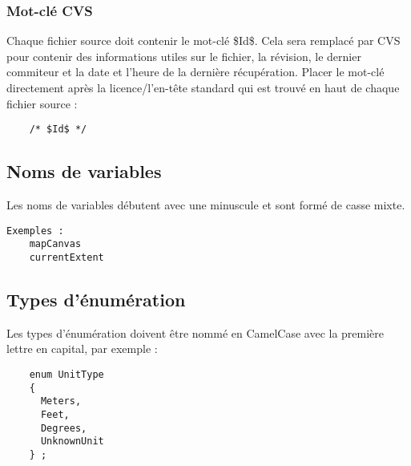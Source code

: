 \subsubsection{Mot-cl\'e CVS}
Chaque fichier source doit contenir le mot-cl\'e \$Id\$. Cela sera remplac\'e par CVS pour contenir des informations utiles sur le fichier, la r\'evision, le dernier commiteur et la date et l'heure de la derni\`ere r\'ecup\'eration. 
Placer le mot-cl\'e directement apr\`es la licence/l'en-t\^ete standard qui est trouv\'e en haut de chaque fichier source :
\begin{verbatim}
	/* $Id$ */
\end{verbatim}

\subsection{Noms de variables}
Les noms de variables d\'ebutent avec une minuscule et sont form\'e de casse mixte.
\begin{verbatim}
Exemples :
	mapCanvas
	currentExtent
\end{verbatim}
\subsection{Types d'\'enum\'eration}
Les types d'\'enum\'eration doivent \^etre nomm\'e en CamelCase avec la premi\`ere lettre en capital, par exemple :
\begin{verbatim}
    enum UnitType
    {
      Meters,
      Feet,
      Degrees,
      UnknownUnit
    } ;
\end{verbatim}

